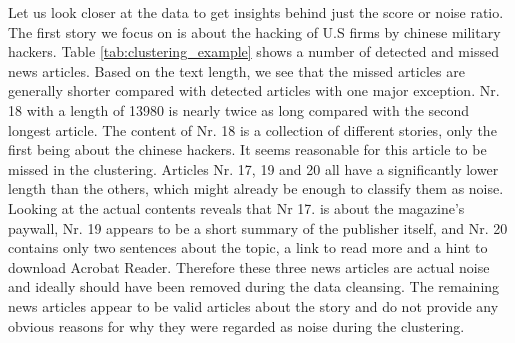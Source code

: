 Let us look closer at the data to get insights behind just the score or noise ratio.
The first story we focus on is about the hacking of U.S firms by chinese military hackers.
Table \ref{tab:clustering_example} shows a number of detected and missed news articles.
Based on the text length, we see that the missed articles are generally shorter compared with detected articles with one major exception.
Nr. 18 with a length of 13980 is nearly twice as long compared with the second longest article.
The content of Nr. 18 is a collection of different stories, only the first being about the chinese hackers.
It seems reasonable for this article to be missed in the clustering.
Articles Nr. 17, 19 and 20 all have a significantly lower length than the others,
which might already be enough to classify them as noise.
Looking at the actual contents reveals that Nr 17. is about the magazine's paywall,
Nr. 19 appears to be a short summary of the publisher itself, and Nr. 20 contains only two sentences about the topic,
a link to read more and a hint to download Acrobat Reader.
Therefore these three news articles are actual noise and ideally should have been removed during the data cleansing.
The remaining news articles appear to be valid articles about the story
and do not provide any obvious reasons for why they were regarded as noise during the clustering.

